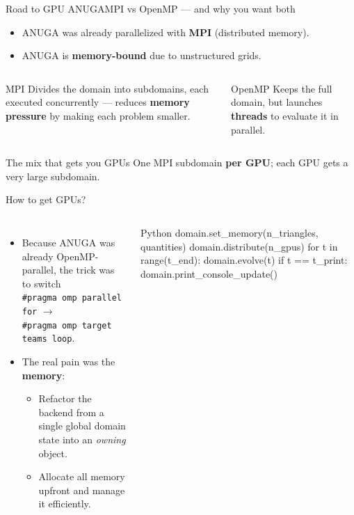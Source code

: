 \documentclass[aspectratio=169]{beamer}
\begin{document}
\begin{frame}{Road to GPU ANUGA}{MPI vs OpenMP --- and why you want both}
  \begin{itemize}
    \item ANUGA was already parallelized with \textbf{MPI} (distributed memory).
    \item ANUGA is \textbf{memory-bound} due to unstructured grids.
  \end{itemize}
  \begin{columns}[T,onlytextwidth]
      \begin{block}{MPI}
        Divides the domain into subdomains, each executed concurrently --- reduces \textbf{memory pressure} by making each problem smaller.
      \end{block}
      \begin{block}{OpenMP}
        Keeps the full domain, but launches \textbf{threads} to evaluate it in parallel.
      \end{block}
  \end{columns}
  \vspace{.3em}
  \begin{exampleblock}{The mix that gets you GPUs}
    One MPI subdomain \textbf{per GPU}; each GPU gets a very large subdomain.
  \end{exampleblock}
\end{frame}

\begin{frame}[fragile]{How to get GPUs?}
  \begin{columns}[T,onlytextwidth]
      \begin{itemize}
        \item Because ANUGA was already OpenMP-parallel, the trick was to switch\\
          \texttt{\#pragma omp parallel for} $\to$\\
          \texttt{\#pragma omp target teams loop}.
        \item The real pain was the \textbf{memory}:
          \begin{itemize}
            \item Refactor the backend from a single global domain state into an \emph{owning} object.
            \item Allocate all memory upfront and manage it efficiently.
          \end{itemize}
      \end{itemize}
      \begin{cookiecode}[title={the evolve loop}]{Python}
domain.set_memory(n_triangles, quantities)
domain.distribute(n_gpus)
for t in range(t_end):
    domain.evolve(t)
    if t == t_print:
        domain.print_console_update()
      \end{cookiecode}
  \end{columns}
\end{frame}
\end{document}
